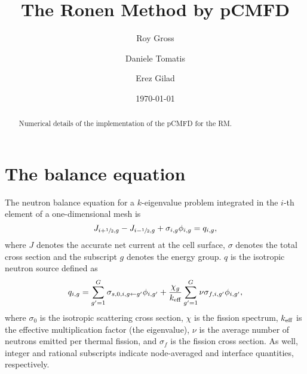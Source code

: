 \documentclass[%
superscriptaddress,
 amsmath,amssymb,
]{revtex4-2}
\newcommand{\keff}{{\ensuremath{k_{\textrm{\scriptsize{eff}}}}}}
\newcommand{\hzi}{\ensuremath{\sfrac{1}{2}}}
\begin{document}
	
	
	\title{The Ronen Method by pCMFD}%
	
	\author{Roy Gross}
	\author{Daniele Tomatis}
	\author{Erez Gilad}
	
	\date{\today}%
	
	\begin{abstract}
		Numerical details of the implementation of the pCMFD for the RM.
	\end{abstract}
	
	\maketitle
	
	
\section{The balance equation}
	
	The neutron balance equation for a $k$-eigenvalue problem integrated in the $i$-th element of a one-dimensional mesh is
	\begin{equation}
		\label{eq:balance}
		J_{i+\hzi,g} - J_{i-\hzi,g} + \sigma_{i,g} \phi_{i,g} = q_{i,g},
	\end{equation}
	where $J$ denotes the accurate net current at the cell surface, $\sigma$ denotes the total cross section and the subscript $g$ denotes the energy group. $q$ is the isotropic neutron source defined as
	\begin{equation}
		\label{eq:qsrc}
		q_{i,g} = \sum\limits_{g'=1}^G\sigma_{s,0,i,g\leftarrow g'}\phi_{i,g'} +
		\frac{\chi_g}{\keff}\sum\limits_{g'=1}^G\nu\sigma_{f,i,g'}\phi_{i,g'},
	\end{equation}
	where $\sigma_0$ is the isotropic scattering cross section, $\chi$ is the fission spectrum, $\keff$ is the effective multiplication factor (the eigenvalue), $\nu$ is the average number of neutrons emitted per thermal fission, and $\sigma_f$ is the fission cross section. As well, integer and rational subscripts indicate node-averaged and interface quantities, respectively.
	
\end{document}
